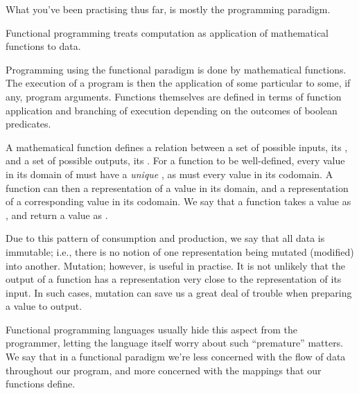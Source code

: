 What you've been practising thus far, is mostly the 
programming paradigm.

\begin{definition}

Functional programming treats computation as application of mathematical
functions to  data.

\end{definition}

Programming using the functional paradigm is done by 
mathematical functions. The execution of a program is then the application of
some particular  to some, if any, program arguments.
Functions themselves are defined in terms of function application and branching
of execution depending on the outcomes of boolean predicates.

A mathematical function defines a relation between a set of possible inputs,
its , and a set of possible outputs, its . For a
function to be well-defined, every value in its domain of must have a
\emph{unique} , as must every value in its codomain.  A
function can then  a representation of a value in its domain, and
 a representation of a corresponding value in its codomain. We say
that a function takes a value as , and return a value as
.


Due to this pattern of consumption and production, we say that all data is
immutable; i.e., there is no notion of one representation being mutated
(modified) into another. Mutation; however, is useful in practise. It is not
unlikely that the output of a function has a representation very close to the
representation of its input. In such cases, mutation can save us a great deal
of trouble when preparing a value to output.

Functional programming languages usually hide this aspect from the programmer,
letting the language itself worry about such ``premature'' matters. We say that
in a functional paradigm we're less concerned with the flow of data throughout
our program, and more concerned with the mappings that our functions define.
